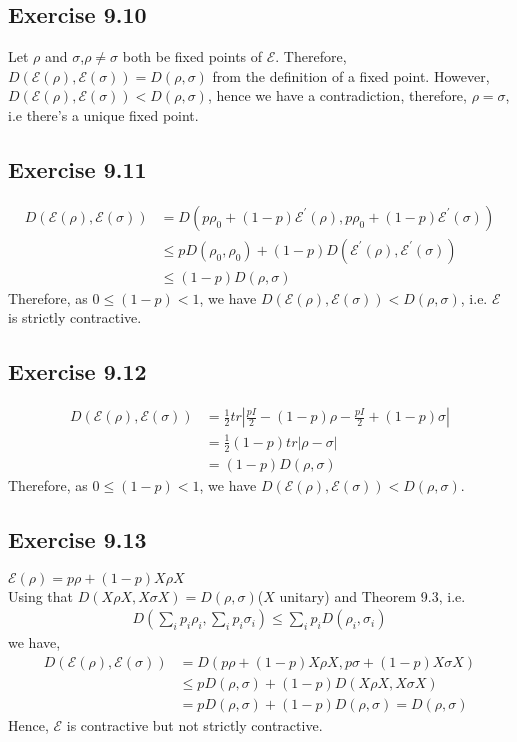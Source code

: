\documentclass[a4paper,12pt]{article}
\begin{document}
\subsection*{Exercise 9.10}
Let $\rho$ and $\sigma$,$\rho\neq\sigma$ both be fixed points of $\mathcal{E}$. Therefore,
$D(\mathcal{E}(\rho),\mathcal{E}(\sigma))=D(\rho, \sigma)$ from the definition of a fixed point.
However, $D(\mathcal{E}(\rho),\mathcal{E}(\sigma))<D(\rho, \sigma)$, hence we have a contradiction,
therefore, $\rho=\sigma$, i.e there's a unique fixed point.
\subsection*{Exercise 9.11}
\begin{align*}
D(\mathcal{E}(\rho), \mathcal{E}(\sigma))&=
D(p\rho_0+(1-p)\mathcal{E}^\prime(\rho), p\rho_0+(1-p)\mathcal{E}^\prime(\sigma))\\&\leq
pD(\rho_0,\rho_0)+(1-p)D(\mathcal{E}^\prime(\rho),\mathcal{E}^\prime(\sigma))\\&\leq
(1-p)D(\rho, \sigma)   
\end{align*}
Therefore, as $0\leq (1-p)< 1$, we have $D(\mathcal{E}(\rho), \mathcal{E}(\sigma))<D(\rho,\sigma)$, i.e.
$\mathcal{E}$ is strictly contractive.
\subsection*{Exercise 9.12}
\begin{align*}
    D(\mathcal{E}(\rho), \mathcal{E}(\sigma))&=\frac{1}{2}tr\left|\frac{pI}{2}-(1-p)\rho-
    \frac{pI}{2}+(1-p)\sigma\right|\\&=\frac{1}{2}(1-p)tr|\rho-\sigma|\\
    &=(1-p)D(\rho, \sigma)
\end{align*}
Therefore, as $0\leq (1-p)< 1$, we have $D(\mathcal{E}(\rho), \mathcal{E}(\sigma))<D(\rho,\sigma)$.
\subsection*{Exercise 9.13}
$\mathcal{E}(\rho)=p\rho+(1-p)X\rho X$\\
Using that $D(X\rho X, X\sigma X)=D(\rho, \sigma)$($X$ unitary) and 
Theorem 9.3, i.e.\\
\begin{align*}
    D\left(\displaystyle\sum_ip_i\rho_i,\sum_ip_i\sigma_i\right)\leq\sum_ip_iD(\rho_i, \sigma_i)
\end{align*}
we have,
\begin{align*}
    D(\mathcal{E}(\rho), \mathcal{E}(\sigma))&=
    D(p\rho+(1-p)X\rho X, p\sigma+(1-p)X\sigma X)\\&\leq
    pD(\rho,\sigma)+(1-p)D(X\rho X, X\sigma X)\\&=
    pD(\rho,\sigma)+(1-p)D(\rho, \sigma)=D(\rho, \sigma)
\end{align*}
Hence, $\mathcal{E}$ is contractive but not strictly contractive.
\end{document}
